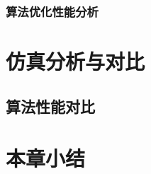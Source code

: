 \subsubsection{算法优化性能分析}




\section{仿真分析与对比}
\label{hg:sec:simulation}

\subsection{算法性能对比}
\label{simu:sub:conpare}

\section{本章小结}
\label{hg:sec:conclusion}




